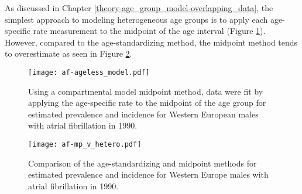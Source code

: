As discussed in Chapter \ref{theory-age_group_model-overlapping_data}, the simplest approach to modeling heterogeneous age groups is to apply each age-specific rate measurement to the midpoint of the age interval (Figure \ref{fig:app-af mp data}).  However, compared to the age-standardizing method, the midpoint method tends to overestimate as seen in Figure \ref{fig:app-af compare}.

    \begin{figure}[h]
        \begin{center}
            \texttt{[image: af-ageless\_model.pdf]}
            \caption{Using a compartmental model midpoint method, data were fit by applying the age-specific rate to the midpoint of the age group for estimated prevalence and incidence for Western European males with atrial fibrillation in 1990.}
            \label{fig:app-af mp data}
        \end{center}
    \end{figure}

    \begin{figure}[h]
        \begin{center}
            \texttt{[image: af-mp\_v\_hetero.pdf]}
            \caption{Comparison of the age-standardizing and midpoint methods for estimated prevalence and incidence for Western Europe males with atrial fibrillation in 1990.}
            \label{fig:app-af compare}
        \end{center}
    \end{figure}
